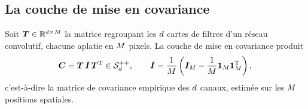 
\subsection{La couche de mise en covariance}
\label{sec:spdnet-covpool-couche}

\begin{definition}
\label{def:spdnet-covpool}
  Soit $\boldsymbol{T}\in\mathbb{R}^{d\times M}$ la matrice regroupant les $d$
  cartes de filtres d'un réseau convolutif, chacune aplatie en $M$ pixels.
  La couche de mise en covariance produit
  \begin{equation}
    \boldsymbol{C}
    =
    \boldsymbol{T}\,\bar{\boldsymbol{I}}\,\boldsymbol{T}^{\mathrm{T}}
    \in\mathcal{S}_{d}^{++},
    \qquad
    \bar{\boldsymbol{I}}
    =
    \frac{1}{M}\left(\boldsymbol{I}_{M}-\frac{1}{M}\boldsymbol{1}_{M}\boldsymbol{1}_{M}^{\mathrm{T}}\right),
    \label{eq:spdnet-covpool}
  \end{equation}
  c'est-à-dire la matrice de covariance empirique des $d$ canaux, estimée
  sur les $M$ positions spatiales.
\end{definition}

\begin{figure}[htb]
  \begin{center}
    \makebox[\textwidth][c]{}
  \end{center}
  \caption{%
  }
  \label{fig:spdnet-covpool}
\end{figure}

